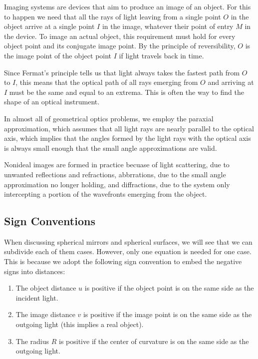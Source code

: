 \documentclass[english,a4paper,12pt]{report}
\begin{document}
Imaging systems are devices that aim to produce an image of an object. For this to happen we need that all the rays of light leaving from a single point \(O\) in the object arrive at a single point \(I\) in the image, whatever their point of entry \(M\) in the device. To image an actual object, this requirement must hold for every object point and its conjugate image point. By the principle of reversibility, \(O\) is the image point of the object point \(I\) if light travels back in time.

Since Fermat's principle tells us that light always takes the fastest path from \(O\) to \(I\), this means that the optical path of all rays emerging from \(O\) and arriving at \(I\) must be the same and equal to an extrema. This is often the way to find the shape of an optical instrument.

In almost all of geometrical optics problems, we employ the paraxial approximation, which assumes that all light rays are nearly parallel to the optical axis, which implies that the angles formed by the light rays with the optical axis is always small enough that the small angle approximations are valid.

Nonideal images are formed in practice becuase of light scattering, due to unwanted reflections and refractions, abbrrations, due to the small angle approximation no longer holding, and diffractions, due to the system only intercepting a portion of the wavefronts emerging from the object.


\subsection{Sign Conventions}

When discussing spherical mirrors and spherical surfaces, we will see that we can subdivide each of them cases. However, only one equation is needed for one case. This is because we adopt the following sign convention to embed the negative signs into distances:

\begin{enumerate}
    \item The object distance \(u\) is positive if the object point is on the same side as the incident light.
    \item The image distance \(v\) is positive if the image point is on the same side as the outgoing light (this implies a real object).
    \item The radius \(R\) is positive if the center of curvature is on the same side as the outgoing light.
\end{enumerate}
\end{document}
